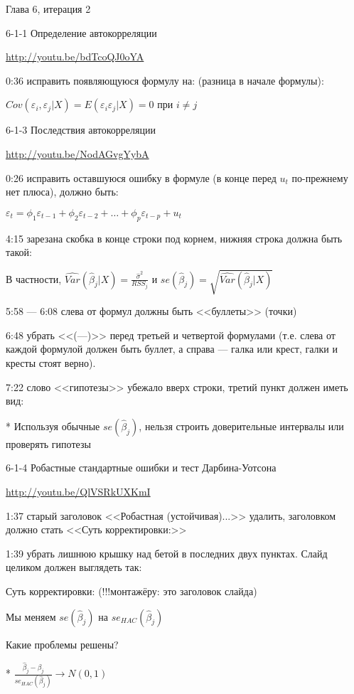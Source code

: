 \documentclass[12pt,a4paper]{article}
\newcommand{\e}{\varepsilon}
\renewcommand{\b}{\beta}
\newcommand{\hb}{\hat{\b}}
\begin{document}
Глава 6, итерация 2

6-1-1 Определение автокорреляции 

\url{http://youtu.be/bdTcoQJ0oYA}

0:36 исправить появляющуюся формулу на: (разница в начале формулы):

$Cov(\e_i,\e_j|X)=E(\e_i \e_j|X)=0$ при $i\neq j$



6-1-3 Последствия автокорреляции

\url{http://youtu.be/NodAGvgYybA}

0:26 исправить оставшуюся ошибку в формуле (в конце перед $u_t$ по-прежнему нет плюса), должно быть:

$\e_{t}=\phi_1 \e_{t-1}+\phi_2 \e_{t-2} +\ldots + \phi_p \e_{t-p}+u_t$

4:15 зарезана скобка в конце строки под корнем, нижняя строка должна быть такой:

В частности, $\widehat{Var}(\hat{\beta}_j|X)=\frac{\hat{\sigma}^2}{RSS_j}$
и $se(\hat{\beta}_j)=\sqrt{\widehat{Var}(\hat{\beta}_j|X)}$

5:58 --- 6:08 слева от формул должны быть <<буллеты>> (точки)

6:48 убрать <<(---)>> перед третьей и четвертой формулами (т.е. слева от каждой формулой  должен быть буллет, а справа --- галка или крест, галки и кресты стоят верно).

7:22 слово <<гипотезы>> убежало вверх строки, третий пункт должен иметь вид:

* Используя обычные $se(\hb_j)$, нельзя строить доверительные интервалы или проверять гипотезы

6-1-4 Робастные стандартные ошибки и тест Дарбина-Уотсона

\url{http://youtu.be/QlVSRkUXKmI}

1:37 старый заголовок <<Робастная (устойчивая)...>> удалить, заголовком должно стать <<Суть корректировки:>>

1:39 убрать лишнюю крышку над бетой в последних двух пунктах. Слайд целиком должен выглядеть так:

Суть корректировки:  (!!!монтажёру: это заголовок слайда)

Мы меняем $se(\hat{\beta}_j)$ на $se_{HAC}(\hat{\beta}_j)$

Какие проблемы решены?

* $\frac{\hat{\beta}_j-\beta_j}{se_{HAC}(\hat{\beta}_j)} \to N(0,1)$ 
\end{document}
